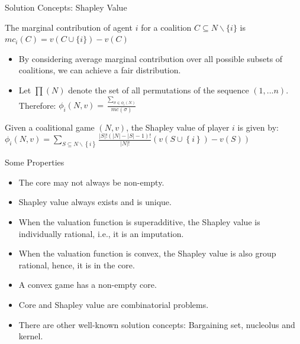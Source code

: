 \documentclass{beamer}
\begin{document}
\begin{frame}{Solution Concepts: Shapley Value}
    \begin{definition} \label{dfn:marginalcontribution}
        The {\color{blue}marginal contribution} of agent $i$ for a coalition $C \subseteq N \backslash \{i\}$ is $mc_i(C) = v(C \cup \{i\}) - v(C)$
    \end{definition}

    \begin{itemize}
        \item By considering average marginal contribution over all possible subsets of coalitions, we can achieve a fair distribution.\\
        \item Let $\prod(N)$ denote the set of all permutations of the sequence $(1,...n)$. Therefore: $\phi_i(N,v) = \frac{\sum_{\sigma \in \phi_i(N)}}{mc(\sigma)}$
    \end{itemize}

    \begin{definition} \label{dfn:shapleyvalue}
        Given a coalitional game $(N,v)$, the Shapley value of player $i$ is given by: \\
        $\phi_i(N,v) = \sum_{S \subseteq N \backslash \left\{i\right\} } \frac{|S|! (|N|-|S|-1)!}{|N|!} (v(S \cup \left\{i\right\}) - v(S))$
    \end{definition}
\end{frame}
\begin{frame}{Some Properties}
    \begin{itemize}
        \item The core may not always be non-empty.
        \item Shapley value always exists and is unique.
        \item When the valuation function is {\color{blue}superadditive}, the Shapley value is {\color{blue}individually rational}, i.e., it is an imputation.
        \item When the valuation function is {\color{blue}convex}, the Shapley value is also group rational, hence, it is in the {\color{blue}core}.
        \item A convex game has a non-empty core.
        \item Core and Shapley value are combinatorial problems.
        \item There are other well-known solution concepts: Bargaining set, nucleolus and kernel.
    \end{itemize}
\end{frame}
\end{document}
